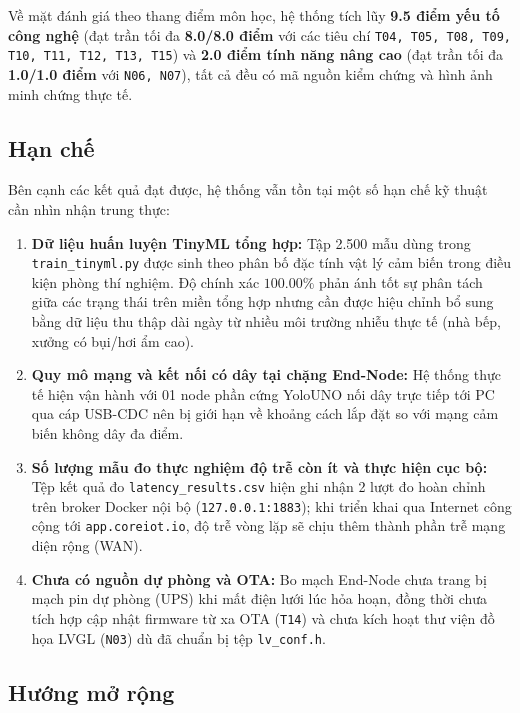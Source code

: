 Về mặt đánh giá theo thang điểm môn học, hệ thống tích lũy \textbf{9.5 điểm yếu tố công nghệ} (đạt trần tối đa \textbf{8.0/8.0 điểm} với các tiêu chí \texttt{T04, T05, T08, T09, T10, T11, T12, T13, T15}) và \textbf{2.0 điểm tính năng nâng cao} (đạt trần tối đa \textbf{1.0/1.0 điểm} với \texttt{N06, N07}), tất cả đều có mã nguồn kiểm chứng và hình ảnh minh chứng thực tế.

\subsection{Hạn chế}
\label{subsec:han-che}

Bên cạnh các kết quả đạt được, hệ thống vẫn tồn tại một số hạn chế kỹ thuật cần nhìn nhận trung thực:
\begin{enumerate}[leftmargin=*, itemsep=3pt]
  \item \textbf{Dữ liệu huấn luyện TinyML tổng hợp:} Tập 2.500 mẫu dùng trong \texttt{train\_tinyml.py} được sinh theo phân bố đặc tính vật lý cảm biến trong điều kiện phòng thí nghiệm. Độ chính xác $100.00\%$ phản ánh tốt sự phân tách giữa các trạng thái trên miền tổng hợp nhưng cần được hiệu chỉnh bổ sung bằng dữ liệu thu thập dài ngày từ nhiều môi trường nhiễu thực tế (nhà bếp, xưởng có bụi/hơi ẩm cao).
  \item \textbf{Quy mô mạng và kết nối có dây tại chặng End-Node:} Hệ thống thực tế hiện vận hành với 01 node phần cứng YoloUNO nối dây trực tiếp tới PC qua cáp USB-CDC nên bị giới hạn về khoảng cách lắp đặt so với mạng cảm biến không dây đa điểm.
  \item \textbf{Số lượng mẫu đo thực nghiệm độ trễ còn ít và thực hiện cục bộ:} Tệp kết quả đo \texttt{latency\_results.csv} hiện ghi nhận 2 lượt đo hoàn chỉnh trên broker Docker nội bộ (\texttt{127.0.0.1:1883}); khi triển khai qua Internet công cộng tới \texttt{app.coreiot.io}, độ trễ vòng lặp sẽ chịu thêm thành phần trễ mạng diện rộng (WAN).
  \item \textbf{Chưa có nguồn dự phòng và OTA:} Bo mạch End-Node chưa trang bị mạch pin dự phòng (UPS) khi mất điện lưới lúc hỏa hoạn, đồng thời chưa tích hợp cập nhật firmware từ xa OTA (\texttt{T14}) và chưa kích hoạt thư viện đồ họa LVGL (\texttt{N03}) dù đã chuẩn bị tệp \texttt{lv\_conf.h}.
\end{enumerate}

\subsection{Hướng mở rộng}
\label{subsec:huong-mo-rong}

